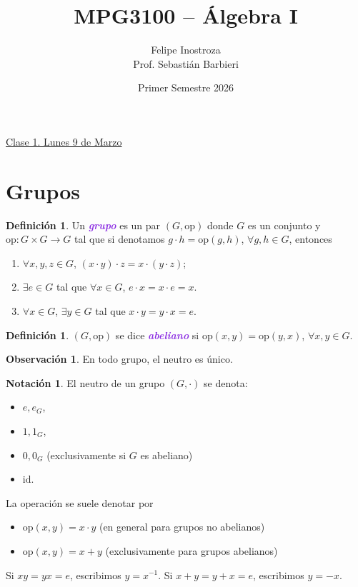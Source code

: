 \documentclass{article}
\title{MPG3100 -- Álgebra I}
\author{Felipe Inostroza \\ Prof. Sebastián Barbieri}
\date{Primer Semestre 2026}
\theoremstyle{definition}
\newtheorem{definition}[theorem]{Definición}
\newtheorem*{notation}{Notación}
\newtheorem*{obs}{Observación}
\theoremstyle{remark}
\numberwithin{equation}{section}
\newcommand{\id}{\mathrm{id}}
\newcommand{\op}{\mathrm{op}}
\newcommand{\wea}[1]{\textcolor{BlueViolet}{\textbf{\emph{#1}}}}
\newcommand{\fecha}[1]{\begin{flushright} \underline{#1} \end{flushright}}
\begin{document}
\maketitle
\tableofcontents

\newpage
\fecha{Clase 1. Lunes 9 de Marzo}
\section{Grupos}

\begin{definition}
  Un \wea{grupo} es un par $(G,\mathrm{op})$ donde $G$ es un conjunto y $\mathrm{op} \colon G \times G \to G$ tal que si denotamos $g\cdot h = \mathrm{op}(g,h)$, $\forall g,h \in G$, entonces
  \begin{enumerate}[(1)]
    \item $\forall x,y,z \in G$, $(x \cdot y) \cdot z = x \cdot (y \cdot z)$;
    \item $\exists e \in G$ tal que $\forall x \in G$, $e \cdot x = x \cdot e = x$.
    \item $\forall x \in G$, $\exists y \in G$ tal que $x \cdot y = y \cdot x = e$.
  \end{enumerate}
\end{definition}

\begin{definition}
  $(G,\op)$ se dice \wea{abeliano} si $\op(x,y) = \op(y,x)$, $\forall x,y \in G$.
\end{definition}

\begin{obs}
  En todo grupo, el neutro es único.
\end{obs}

\begin{notation}
  El neutro de un grupo $(G,\cdot)$ se denota:
  \begin{itemize}
    \item $e, e_G$,
    \item $1, 1_G$,
    \item $0, 0_G$ (exclusivamente si $G$ es abeliano)
    \item $\id$.
  \end{itemize}
  La operación se suele denotar por
  \begin{itemize}
    \item $\op(x,y) = x \cdot y$ (en general para grupos no abelianos)
    \item $\op(x,y) = x+y$ (exclusivamente para grupos abelianos)
  \end{itemize}
  Si $xy = yx = e$, escribimos $y = x^{-1}$.
  Si $x+y=y+x=e$, escribimos $y = -x$.
\end{notation}
\end{document}
